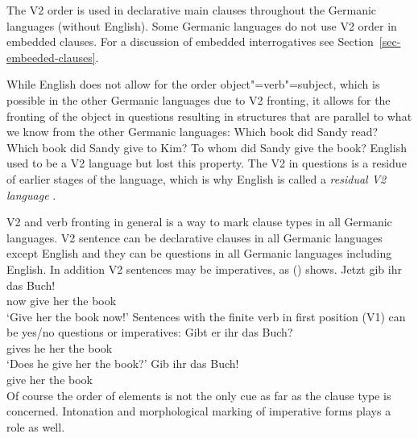 The V2 order is used in declarative main clauses throughout the Germanic languages (without
English). Some Germanic languages do not use V2 order in embedded clauses. For a discussion of
embedded interrogatives see Section~\ref{sec-embeeded-clauses}.

While English does not allow for the order object"=verb"=subject, which is possible in the other Germanic
languages due to V2 fronting, it allows for the fronting of the object in questions resulting in
structures that are parallel to what we know from the other Germanic languages:
\eal
\ex Which book did Sandy read?
\ex Which book did Sandy give to Kim?
\ex To whom did Sandy give the book?
\zl
English used to be a V2 language but lost this property. The V2 in questions is a residue of earlier
stages of the language, which is why English is called a \emph{residual V2 language} \citep[]{Rizzi1990a-u}. 

V2 and verb fronting in general is a way to mark clause types in all Germanic languages. V2 sentence
can be declarative clauses in all Germanic languages except English and they can be questions in all
Germanic languages including English. In addition V2 sentences may be imperatives, as () shows.
\ea
\gll Jetzt gib ihr das Buch!\\
     now give her the book\\\german
\glt `Give her the book now!'
\z
Sentences with the finite verb in first position (V1) can be yes/no questions or imperatives:
\eal
\ex
\gll Gibt er ihr das Buch?\\
     gives he her the book\\\german
\glt `Does he give her the book?'
\ex 
\gll Gib ihr das Buch!\\
     give her the book\\
\zl
Of course the order of elements is not the only cue as far as the clause type is
concerned. Intonation and morphological marking of imperative forms plays a role as well.

